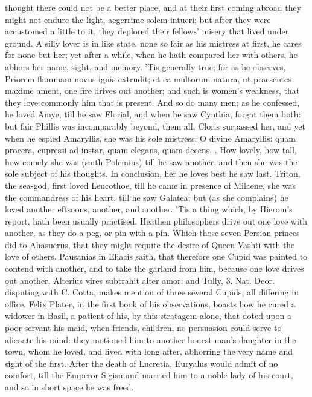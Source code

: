 {thought there could not be a better place, and at their first coming
abroad they might not endure the light, aegerrime solem intueri; but
after they were accustomed a little to it, they deplored their
fellows' misery that lived under ground. A silly lover is in like
state, none so fair as his mistress at first, he cares for none but
her; yet after a while, when he hath compared her with others, he
abhors her name, sight, and memory. 'Tis generally true; for as he
observes, Priorem flammam novus ignis extrudit; et ea multorum
natura, ut praesentes maxime ament, one fire drives out another; and
such is women's weakness, that they love commonly him that is present.
And so do many men; as he confessed, he loved Amye, till he saw
Florial, and when he saw Cynthia, forgat them both: but fair Phillis
was incomparably beyond, them all, Cloris surpassed her, and yet when
he espied Amaryllis, she was his sole mistress; O divine Amaryllis:
quam procera, cupressi ad instar, quam elegans, quam decens, \etc{}. How
lovely, how tall, how comely she was (saith Polemius) till he saw
another, and then she was the sole subject of his thoughts. In
conclusion, her he loves best he saw last. Triton, the sea-god,
first loved Leucothoe, till he came in presence of Milaene, she was the
commandress of his heart, till he saw Galatea: but (as she
complains) he loved another eftsoons, another, and another. 'Tis a
thing which, by Hierom's report, hath been usually practised.
Heathen philosophers drive out one love with another, as they do
a peg, or pin with a pin. Which those seven Persian princes did to
Ahasuerus, that they might requite the desire of Queen Vashti with the
love of others. Pausanias in Eliacis saith, that therefore one Cupid
was painted to contend with another, and to take the garland from him,
because one love drives out another, Alterius vires subtrahit
alter amor; and Tully, 3. Nat. Deor. disputing with C. Cotta, makes
mention of three several Cupids, all differing in office. Felix Plater,
in the first book of his observations, boasts how he cured a widower in
Basil, a patient of his, by this stratagem alone, that doted upon a
poor servant his maid, when friends, children, no persuasion could
serve to alienate his mind: they motioned him to another honest man's
daughter in the town, whom he loved, and lived with long after,
abhorring the very name and sight of the first. After the death of
Lucretia, Euryalus would admit of no comfort, till the Emperor
Sigismund married him to a noble lady of his court, and so in short
space he was freed.

}
